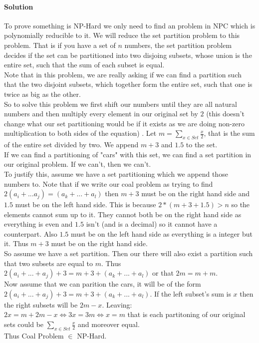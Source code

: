 \documentclass[12pt]{article}
\begin{document}
\paragraph{Solution}
To prove something is NP-Hard we only need to find an problem in NPC which is polynomially reducible to it.  We will reduce the set partition problem to this problem.  That is if you have a set of $n$ numbers, the set partition problem decides if the set can be partitioned into two disjoing subsets, whose union is the entire set, such that the sum of each subset is equal.\\
Note that in this problem, we are really asking if we can find a partition such that the two disjoint subsets, which together form the entire set, such that one is twice as big as the other.
\\
So to solve this problem we first  shift our numbers until they are all natural numbers and then multiply every element in our original set by $2$ (this doesn't change what our set partitioning would be if it exists as we are doing non-zero multiplication to both sides of the equation) . Let $m = \sum\limits_{x \in Set} \frac{x}{2}$, that is the sum of the entire set divided by two. We append $m + 3$ and $1.5$ to the set.\\
If we can find a partitioning of "cars" with this set, we can find a set partition in our original problem.  If we can't, then we can't.\\
To justify this, assume we have a set partitioning which we append those numbers to.  Note that if we write our coal problem as trying to find $ 2(a_i +... a_j) = (a_k + ... + a_l)$ then $m+3$ must be on the right hand side and $1.5$ must be on the left hand side.  This is because $2 * (m +3 + 1.5) > n$ so the elements cannot sum up to it.  They cannot both be on the right hand side as everything is even and $1.5$ isn't (and is a decimal) so it cannot have a counterpart.  Also $1.5$ must be on the left hand side as everything is a integer but it.  Thus $m+3$ must be on the right hand side. \\
So assume we have a set partition. Then our there will also exist a partition such that two subsets are equal to $m$.  Thus $ 2(a_i +... +a_j) + 3 = m +3 + (a_k +... + a_l)$ or that $2 m = m + m$. \\


Now assume that we can parition the cars, it will be of the form $ 2(a_i +... +a_j) + 3 = m +3 + (a_k +... + a_l)$.  If the left subset's sum is $x$ then the right subsets will be $2m -x$. Leaving: $2x = m + 2m -x \iff 3x = 3m \iff x = m$  that is each partitoning of our original sets could be $ \sum\limits_{x \in Set} \frac{x}{2}$ and moreover equal.\\
Thus Coal Problem $\in$ NP-Hard.
\end{document}
